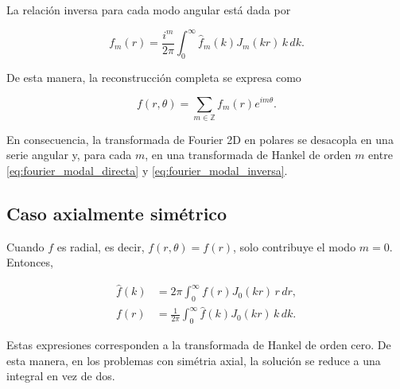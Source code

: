 La relación inversa para cada modo angular está dada por

\begin{equation}
  f_m(r)=\frac{i^m}{2\pi}\int_0^\infty \hat f_m(k)J_m(kr)\,k\,dk.
  \label{eq:fourier_modal_inversa}
\end{equation}

De esta manera, la reconstrucción completa se expresa como

\begin{equation}
  f(r,\theta)=\sum_{m\in\mathbb{Z}} f_m(r)e^{im\theta}.
\end{equation}

En consecuencia, la transformada de Fourier 2D en polares se desacopla en una serie angular y, para cada $m$, en una transformada de Hankel de orden $m$ entre \eqref{eq:fourier_modal_directa} y \eqref{eq:fourier_modal_inversa}.




\subsection{Caso axialmente simétrico}
\label{subsec:fourier_2d_polar_axial_symmetric}



Cuando $f$ es radial, es decir, $f(r,\theta)=f(r)$, solo contribuye el modo $m=0$. Entonces,

\begin{align}
  \hat f(k)&=2\pi\int_0^\infty f(r)J_0(kr)\,r\,dr,
  \label{eq:hankel_orden_cero_directa}\\
  f(r)&=\frac{1}{2\pi}\int_0^\infty \hat f(k)J_0(kr)\,k\,dk.
  \label{eq:hankel_orden_cero_inversa}
\end{align}

Estas expresiones corresponden a la transformada de Hankel de orden cero.
De esta manera, en los problemas con simétria axial, la solución se reduce a una integral en vez de dos.
